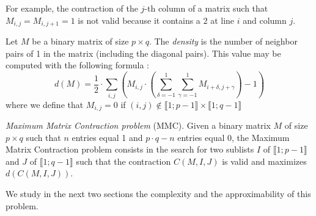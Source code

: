For example, the contraction of the $j$-th column of a matrix such that $M_{i,j} = M_{i,j+1} = 1$ is not valid because it contains a $2$ at line $i$ and column $j$.

\begin{definition}
	\label{def:density}
	Let $M$ be a binary matrix of size $p \times q$. The \emph{density} is the number of neighbor pairs of 1 in the matrix (including the diagonal pairs). This value may be computed with the following formula :
	$$ 
	d(M) = \frac{1}{2} \cdot \sum\limits_{i,j} \left( M_{i,j} \cdot \left(\sum\limits_{\delta = -1}^1 \sum\limits_{\gamma = -1}^1  M_{i+\delta,j+\gamma}\right) - 1 \right)
	$$
	where we define that $M_{i,j}=0$ if $(i,j) \notin \llbracket 1;p-1 \rrbracket \times \llbracket 1;q-1 \rrbracket$
\end{definition}

\begin{problem}\label{problem1}
	\emph{Maximum Matrix Contraction problem} (MMC). Given a binary matrix $M$ of size $p \times q$ such that $n$ entries equal 1 and $p \cdot q - n$ entries equal 0, the Maximum Matrix Contraction problem consists in the search for two sublists $I$ of $\llbracket 1;p-1 \rrbracket$ and $J$ of $\llbracket 1;q-1 \rrbracket$ such that the contraction $C(M,I,J)$ is valid and maximizes $d(C(M,I,J))$.
\end{problem}

We study in the next two sections the complexity and the approximability of this problem.

